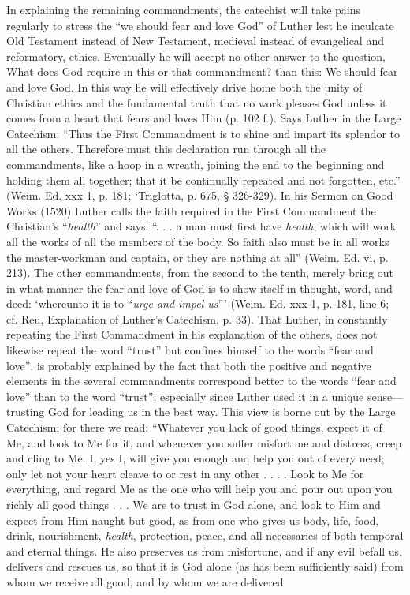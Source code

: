 In explaining the remaining commandments, the catechist will take pains regularly to stress the “we should fear and love God” of Luther lest he inculcate Old Testament instead of New Testament,
medieval instead of evangelical and reformatory, ethics. Eventually he will accept no other answer to the question, What does God require in this or that commandment? than this: We should fear and love God. In this way he will effectively drive home both the unity of Christian ethics and the fundamental truth that no work pleases God unless it comes from a heart that fears and loves Him (p. 102 f.). Says Luther in the Large Catechism: “Thus the First Commandment is to shine and impart its splendor to all the others. Therefore must this declaration run through all the commandments, like a hoop in a wreath, joining the end to the beginning and holding them all together; that it be continually repeated and not forgotten, etc.” (Weim. Ed. xxx 1, p. 181; ‘Triglotta, p. 675, § 326-329). In his Sermon on Good Works (1520) Luther calls the faith required in the First Commandment the Christian’s “\emph{health}” and says: “. . . a man must first have \emph{health}, which will work all the works of all the members of the body. So faith also must be in all works the master-workman and captain, or they are nothing at all” (Weim. Ed. vi, p. 213). The other commandments, from the second to the tenth, merely bring out in what manner the fear and love of God is to show itself in thought, word, and deed: ‘whereunto it is to “\emph{urge and impel us}”’ (Weim. Ed. xxx 1, p. 181, line 6; cf. Reu, Explanation of Luther’s Catechism, p. 33). That Luther, in constantly repeating the First Commandment in his explanation of the others, does not likewise repeat the word “trust” but confines himself to the words “fear and love”, is probably explained by the fact that both the positive and negative elements in the several commandments correspond better to the words “fear and love” than to the word “trust”; especially since Luther used it in a unique sense—trusting God for leading us in the best way. This view is borne out by the Large Catechism; for there we read: “Whatever you lack of good things, expect it of Me, and look to Me for it, and whenever you suffer misfortune and distress, creep and cling to Me. I, yes I, will give you enough and help you out of every need; only let not your heart cleave to or rest in any other . . . . Look to Me for everything, and regard Me as the one who will help you and pour out upon you richly all good things . . . We are to trust in God alone, and look to Him and expect from Him naught but good, as from one who gives us body, life, food, drink, nourishment, \emph{health}, protection, peace, and all necessaries of both temporal and eternal things. He also preserves us from misfortune, and if any evil befall us, delivers and rescues us, so that it is God alone (as has been sufficiently said) from whom we receive all good, and by whom we are delivered

